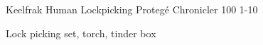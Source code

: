 \filledCS%
  {Keelfrak}%
  {Human}%
  {Lockpicking Proteg\'e}%
  {Chronicler}%
  {{1}{0}{0}}%
  {{1}{-1}{0}}%
  {%
    \renewcommand\rank{Digger}

    \setcounter{Academics}{1}
    \setcounter{Crafts}{2}
    \setcounter{Larceny}{1}
    \setcounter{Melee}{1}
    \longsword
    \partialchain
  }%
  {}%
  {Lock picking set, torch, tinder box}%

\renewcommand\csComments{}

